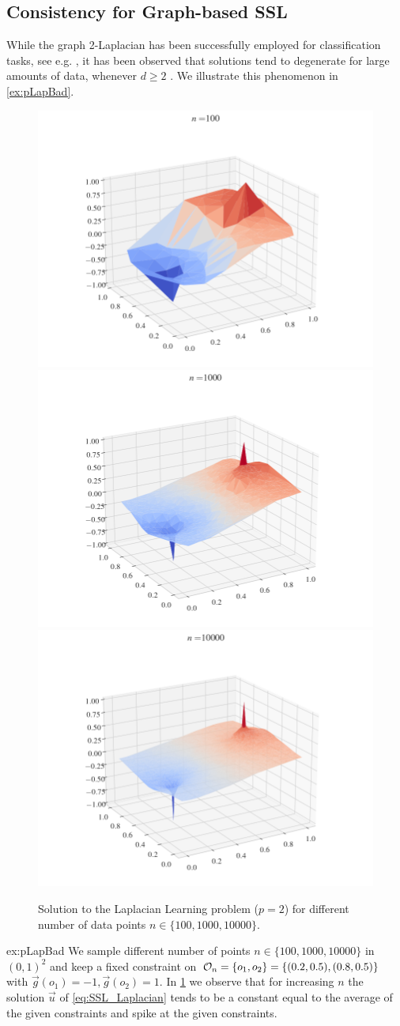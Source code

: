 \subsection{Consistency for Graph-based SSL}\label{sec:CSSL}
%
%
While the graph 2-Laplacian has been successfully employed for classification tasks, see e.g. \cite{zhu2003semi, zhou2005regularization}, it has been observed that solutions tend to degenerate for large amounts of data, whenever $d\geq 2$ \cite{nadler2009statistical, alamgir2011phase, el2016asymptotic}. We illustrate this phenomenon in \cref{ex:pLapBad}.
%
\begin{figure}
\includegraphics[width=.28\textwidth, trim={3.1cm 1cm 3.5cm 0cm},clip]{code/SSL/2Dex_100.png}%
\hfill%
\includegraphics[width=.28\textwidth,trim={3.1cm 1cm 3.5cm 0cm},clip]{code/SSL/2Dex_1000.png}%
\hfill%
\includegraphics[width=.28\textwidth,trim={3.1cm 1cm 3.5cm 0cm},clip]{code/SSL/2Dex_10000.png}%
%
\caption[Solution to the Laplacian Learning problem for different number of data points.]{Solution to the Laplacian Learning problem ($p=2$) for different number of data points $n\in\{100,1000,10000\}$.}\label{fig:pdeg}
\end{figure}
%
%
\begin{example}{}{ex:pLapBad}
We sample different number of points $n\in\{100,1000,10000\}$ in $(0,1)^2$ and keep a fixed constraint on $\mathcal{O}_n=\{o_1, o_2\}=\{(0.2,0.5), (0.8, 0.5)\}$ with $\vec g(o_1) = -1, \vec g(o_2)=1$. In \cref{fig:pdeg} we observe that for increasing $n$ the solution $\vec u$ of \cref{eq:SSL_Laplacian} tends to be a constant equal to the average of the given constraints and spike at the given constraints.
\end{example}
